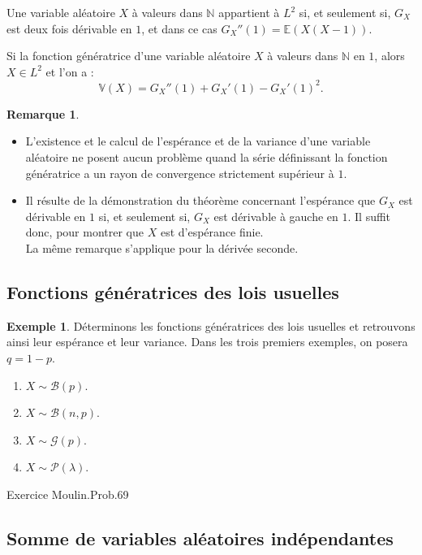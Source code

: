\documentclass[french]{article}
\newcommand{\N}{\mathbb{N}}
\newcommand{\E}{\mathbb{E}}
\newcommand{\V}{\mathbb{V}}
\theoremstyle{plain}
\theoremstyle{definition}
\newtheorem*{ex}{Exemple}
\newtheorem*{rmq}{Remarque}
\theoremstyle{remark}
\begin{document}
\begin{thm}%
	Une variable aléatoire $X$ à valeurs dans $\N$ appartient à $L^2$ si, et seulement si, $G_X$ est deux fois dérivable en $1$, et dans ce cas $G_X''(1)=\E(X(X-1))$.
\end{thm}

\begin{cor}%
	Si la fonction génératrice d'une variable aléatoire $X$ à valeurs dans $\N$ en $1$, alors $X\in L^2$ et l'on a : $$\V(X)=G_X''(1)+G_X'(1)-G_X'(1)^2.$$
\end{cor}

\begin{rmq}
	\begin{itemize}
		\item L'existence et le calcul de l'espérance et de la variance d'une variable aléatoire ne posent aucun problème quand la série définissant la fonction génératrice a un rayon de convergence strictement supérieur à $1$.
		\item Il résulte de la démonstration du théorème concernant l'espérance que $G_X$ est dérivable en $1$ si, et seulement si, $G_X$ est dérivable à gauche en $1$. Il suffit donc, pour montrer que $X$ est d'espérance finie.\\
		La même remarque s'applique pour la dérivée seconde.
	\end{itemize}
\end{rmq}

\subsection{Fonctions génératrices des lois usuelles}

\begin{ex}
	Déterminons les fonctions génératrices des lois usuelles et retrouvons ainsi leur espérance et leur variance. Dans les trois premiers exemples, on posera $q=1-p$.
	\begin{enumerate}
		\item $X\sim\mathcal{B}(p)$. %
		\item $X\sim\mathcal{B}(n,p)$. %
		\item $X\sim\mathcal{G}(p)$. %
		\item $X\sim\mathcal{P}(\lambda)$. %
	\end{enumerate}
\end{ex}

Exercice Moulin.Prob.69

\subsection{Somme de variables aléatoires indépendantes}
\end{document}
